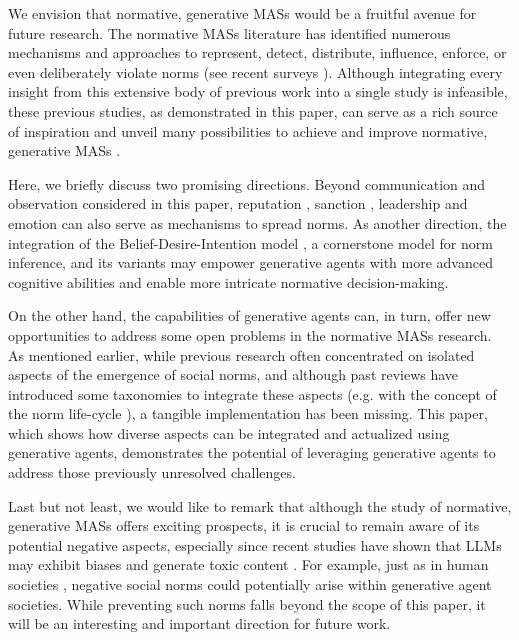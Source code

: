 \documentclass{article}
\begin{document}
We envision that normative, generative MASs would be a fruitful avenue for future research. 
The normative MASs literature has identified numerous mechanisms and approaches to represent, detect, distribute, influence, enforce, or even deliberately violate norms (see recent surveys \cite{santos2017detection,haynes2017engineering,morris2019norm}).
Although integrating every insight from this extensive body of previous work into a single study is infeasible,
these previous studies, as demonstrated in this paper,  can serve as a rich source of inspiration and unveil many possibilities to achieve and improve normative, generative MASs \cite{he2024norm,savarimuthu2024harnessing,haque2024extracting}. 


Here, we briefly discuss two promising directions. Beyond communication and observation considered in this paper, reputation \cite{santos2018social}, sanction \cite{mahmoud2017establishing}, leadership \cite{franks2013learning} and emotion \cite{argente2020normative} can also serve as mechanisms to spread norms.
As another direction, the integration of the Belief-Desire-Intention model \cite{bratman1987intention}, a cornerstone model for norm inference, and its variants \cite{yao2016action,winikoff2021bad,winikoff2023evaluating,ichida2024bdi} may empower generative agents with more advanced cognitive abilities and enable more intricate normative decision-making. 


On the other hand, the capabilities of generative agents can, in turn, offer new opportunities to address some open problems in the normative MASs research. As mentioned earlier, while previous research often concentrated on isolated aspects of the emergence of social norms, and although past reviews have introduced some taxonomies to integrate these aspects (e.g. with the concept of the norm life-cycle \cite{savarimuthu2009social}), a tangible implementation has been missing. This paper, which shows
how diverse aspects can be integrated and actualized using generative agents, demonstrates the potential of leveraging generative agents to address those previously unresolved challenges. 

Last but not least, we would like to remark that although the study of normative, generative MASs offers exciting prospects, it is crucial to remain aware of its potential negative aspects, especially since recent studies have shown that LLMs may exhibit biases and generate toxic content \cite{abid2021persistent}. 
For example, just as in human societies \cite{abbink2017peer}, negative social norms could potentially arise within generative agent societies. 
While preventing such norms falls beyond the scope of this paper, it will be an interesting and important direction for future work.
\end{document}
